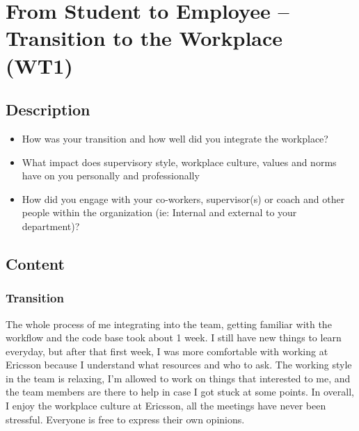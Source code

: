 \newpage
\section{From Student to Employee – Transition to the Workplace (WT1)}

\subsection{Description}

\begin{itemize}
    \item How was your transition and how well did you integrate the workplace?
    \item What impact does supervisory style, workplace culture, values and norms have on you personally and professionally
    \item How did you engage with your co-workers, supervisor(s) or coach and other people within the organization (ie: Internal and external to your department)?
\end{itemize}

\subsection{Content}

\subsubsection{Transition}
The whole process of me integrating into the team, getting familiar with the workflow and the code base took about 1 week.
I still have new things to learn everyday, but after that first week, I was more comfortable with working at Ericsson because I understand what resources and who to ask.
The working style in the team is relaxing, I'm allowed to work on things that interested to me, and the team members are there to help in case I got stuck at some points.
In overall, I enjoy the workplace culture at Ericsson, all the meetings have never been stressful.
Everyone is free to express their own opinions.

